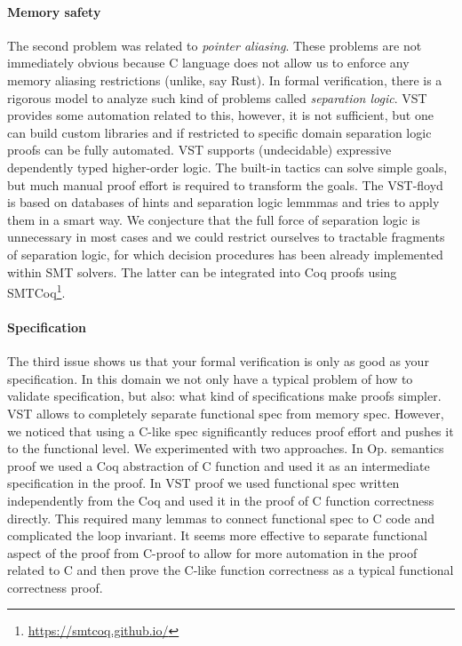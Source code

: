 \documentclass{article}
\begin{document}
\paragraph{Memory safety} The second problem was related to \textit{pointer aliasing}. These problems are not immediately obvious because C language does not allow us to enforce any memory aliasing restrictions (unlike, say Rust). In formal verification, there is a rigorous model to analyze such kind of problems called \textit{separation logic}. VST provides some automation related to this, however, it is not sufficient, but one can build custom libraries and if restricted to specific domain separation logic proofs can be fully automated. VST supports (undecidable) expressive dependently typed higher-order logic. The built-in tactics can solve simple goals, but much manual proof effort is required to transform the goals. The VST-floyd is based on databases of hints and separation logic lemmmas and tries to apply them in a smart way. We conjecture that the full force of separation logic is unnecessary in most cases and we could restrict ourselves to tractable fragments of separation logic, for which decision procedures has been already implemented within SMT solvers. The latter can be integrated into Coq proofs using SMTCoq\footnote{\url{https://smtcoq.github.io/}}.

\paragraph{Specification} The third issue shows us that your formal verification is only as good as your specification. In this domain we not only have a typical problem of how to validate specification, but also: what kind of specifications make proofs simpler. VST allows to completely separate functional spec from memory spec. However, we noticed that using a C-like spec significantly reduces proof effort and pushes it to the functional level. We experimented with two approaches. In Op. semantics proof we used a Coq abstraction of C function and used it as an intermediate specification in the proof. In VST proof we used functional spec written independently from the Coq and used it in the proof of C function correctness directly. This required many lemmas to connect functional spec to C code and complicated the loop invariant. It seems more effective to separate functional aspect of the proof from C-proof to allow for more automation in the proof related to C and then prove the C-like function correctness as a typical functional correctness proof.


   






  
\end{document}
